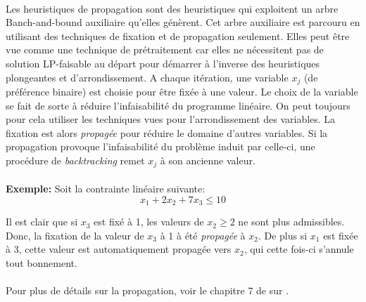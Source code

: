 \documentclass[12pt,a4paper,oneside]{book}
\theoremstyle{definition}
\begin{document}
	\paragraph{}
	Les heuristiques de propagation sont des heuristiques qui exploitent un arbre Banch-and-bound auxiliaire qu'elles génèrent. Cet arbre auxiliaire est parcouru en utilisant des techniques de fixation et de propagation seulement. Elles peut être vue comme une technique de prétraitement car elles ne nécessitent pas de solution LP-faisable au départ pour démarrer à l'inverse des heuristiques plongeantes et d'arrondissement. A chaque itération, une variable $x_j$ (de préférence binaire) est choisie pour être fixée à une valeur. Le choix de la variable se fait de sorte à réduire l'infaisabilité du programme linéaire. On peut toujours pour cela utiliser les techniques vues pour l'arrondissement des variables. La fixation est alors \textit{propagée} pour réduire le domaine d'autres variables. Si la propagation provoque l'infaisabilité du problème induit par celle-ci, une procédure de \textit{backtracking} remet $x_j$ à son ancienne valeur. \\
	\paragraph{}
	\textbf{Exemple:} Soit la contrainte linéaire suivante:\\
	\[
		x_1 + 2 x_2 + 7 x_3 \leq 10 
	\]
	
	Il est clair que si $x_3$ est fixé à 1, les valeurs de $x_2 \geq 2 $ ne sont plus admissibles. Donc, la fixation de la valeur de $x_3$ à 1 à été \textit{propagée} à $x_2$. De plus si $x_1$ est fixée à 3, cette valeur est automatiquement propagée vers $x_2$, qui cette fois-ci s'annule tout bonnement.
	
	\paragraph{}
	Pour plus de détails sur la propagation, voir le chapitre 7 de \cite{Achterberg2007a} sur .
\end{document}
